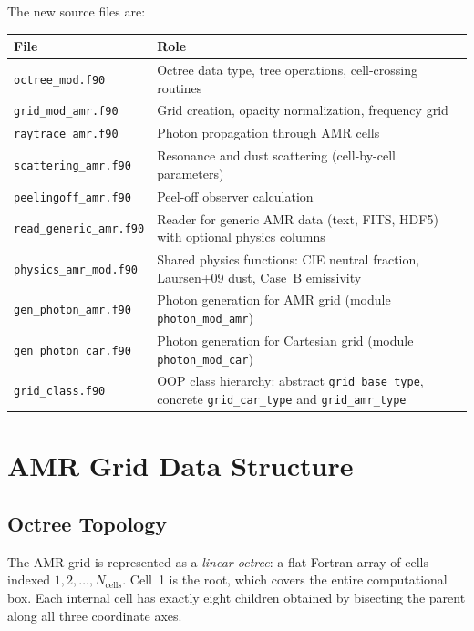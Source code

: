 \documentclass[english,a4paper]{my_memo}
\begin{document}
The new source files are:
\begin{center}
\begin{tabular}{lp{\dimexpr\linewidth-190pt\relax}}
\hline
File & Role \\
\hline
\texttt{octree\_mod.f90}      & Octree data type, tree operations, cell-crossing routines \\
\texttt{grid\_mod\_amr.f90}   & Grid creation, opacity normalization, frequency grid \\
\texttt{raytrace\_amr.f90}    & Photon propagation through AMR cells \\
\texttt{scattering\_amr.f90}  & Resonance and dust scattering (cell-by-cell parameters) \\
\texttt{peelingoff\_amr.f90}  & Peel-off observer calculation \\
\texttt{read\_generic\_amr.f90}& Reader for generic AMR data (text, FITS, HDF5) with optional physics columns \\
\texttt{physics\_amr\_mod.f90}& Shared physics functions: CIE neutral fraction, Laursen+09 dust, Case~B emissivity \\
\texttt{gen\_photon\_amr.f90} & Photon generation for AMR grid (module \texttt{photon\_mod\_amr}) \\
\texttt{gen\_photon\_car.f90} & Photon generation for Cartesian grid (module \texttt{photon\_mod\_car}) \\
\texttt{grid\_class.f90}      & OOP class hierarchy: abstract \texttt{grid\_base\_type},
                                concrete \texttt{grid\_car\_type} and \texttt{grid\_amr\_type} \\
\hline
\end{tabular}
\end{center}

\section{AMR Grid Data Structure}

\subsection{Octree Topology}

The AMR grid is represented as a \emph{linear octree}: a flat Fortran array of
cells indexed $1, 2, \ldots, N_\mathrm{cells}$.  Cell~1 is the root, which
covers the entire computational box.  Each internal cell has exactly eight
children obtained by bisecting the parent along all three coordinate axes.
\end{document}
